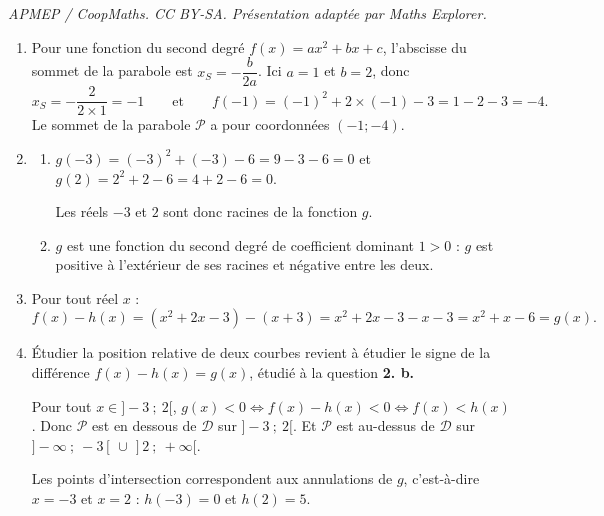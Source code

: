 \documentclass[10pt]{article}
\begin{document}
\noindent\textit{APMEP / CoopMaths. CC BY-SA. Présentation adaptée par Maths Explorer.}\par\medskip
\begin{enumerate}
	\item Pour une fonction du second degré $f(x) = ax^2+bx+c$, l'abscisse du sommet de la parabole
	est $x_S = -\dfrac{b}{2a}$. Ici $a = 1$ et $b = 2$, donc
	\[x_S = -\dfrac{2}{2 \times 1} = -1 \qquad\text{et}\qquad f(-1) = (-1)^2 + 2\times(-1) - 3 = 1 - 2 - 3 = -4.\]
	Le sommet de la parabole $\mathcal{P}$ a pour coordonnées $(-1 ; -4)$.

	\item
	\begin{enumerate}
		\item $g(-3) = (-3)^2 + (-3) - 6 = 9 - 3 - 6 = 0$ \quad et \quad $g(2) = 2^2 + 2 - 6 = 4 + 2 - 6 = 0$.

		Les réels $-3$ et $2$ sont donc racines de la fonction $g$.

		\item $g$ est une fonction du second degré de coefficient dominant $1 > 0$ : $g$ est positive à l'extérieur de ses racines et négative entre les
		deux.

		\begin{center}
		\end{center}
	\end{enumerate}

	\item Pour tout réel $x$ :
	\[f(x) - h(x) = \left(x^2 + 2x - 3\right) - (x+3) = x^2 + 2x - 3 - x - 3 = x^2 + x - 6 = g(x).\]

	\item Étudier la position relative de deux courbes revient à étudier le signe de la différence
	$f(x) - h(x) = g(x)$, étudié à la question \textbf{2. b.}
	
Pour tout $x \in ]-3~;~2[$, $g(x) <0 \iff f(x)-h(x) <0 \iff f(x) < h(x)$.
Donc $\mathcal{P}$ est en dessous de $\mathcal{D}$ sur $]-3~;~2[$.
Et $\mathcal{P}$ est au-dessus de $\mathcal{D}$ sur $]-\infty~;~-3[ \,\cup\, ]2~;~+\infty[$.

	Les points d'intersection correspondent aux annulations de $g$, c'est-à-dire $x = -3$ et
	$x = 2$ : $h(-3) = 0$ et $h(2) = 5$.


\end{enumerate}
\end{document}
